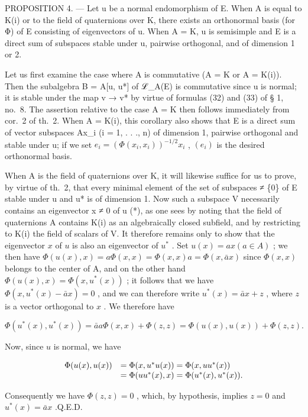 PROPOSITION 4. --- Let u be a normal endomorphism of E. When A is equal to K(i) or to the field of quaternions over K, there exists an orthonormal basis (for Φ) of E consisting of eigenvectors of u. When A = K, u is semisimple and E is a direct sum of subspaces stable under u, pairwise orthogonal, and of dimension 1 or 2.

Let us first examine the case where A is commutative (A = K or A = K(i)). Then the subalgebra B = A{[}u, u*{]} of ℒ\_A(E) is commutative since u is normal; it is stable under the map v → v* by virtue of formulas (32) and (33) of § 1, no.~8. The assertion relative to the case A = K then follows immediately from cor.~2 of th.~2. When A = K(i), this corollary also shows that E is a direct sum of vector subspaces Ax\_i (i = 1, . . ., n) of dimension 1, pairwise orthogonal and stable under u; if we set \(e_{i} = (\Phi(x_{i}, x_{i}))^{-1/2}x_{i}\) , \((e_{i})\) is the desired orthonormal basis.

When A is the field of quaternions over K, it will likewise suffice for us to prove, by virtue of th.~2, that every minimal element of the set of subspaces ≠ \{0\} of E stable under u and u* is of dimension 1. Now such a subspace V necessarily contains an eigenvector x ≠ 0 of u (*), as one sees by noting that the field of quaternions A contains K(i) as an algebraically closed subfield, and by restricting to K(i) the field of scalars of V. It therefore remains only to show that the eigenvector \(x\) of \(u\) is also an eigenvector of \(u^{*}\) . Set \(u(x) = ax (a \in A)\) ; we then have \(\Phi(u(x), x) = a\Phi(x, x) = \Phi(x, x)a = \Phi(x, \bar{a}x)\) since \(\Phi(x, x)\) belongs to the center of A, and on the other hand \(\Phi(u(x), x) = \Phi(x, u^*(x))\) ; it follows that we have \(\Phi(x, u^*(x) - \bar{a}x) = 0\) , and we can therefore write \(u^*(x) = \bar{a}x + z\) , where \(z\) is a vector orthogonal to \(x\) . We therefore have

\[
\Phi (u ^ {*} (x), u ^ {*} (x)) = \bar {a} a \Phi (x, x) + \Phi (z, z) = \Phi (u (x), u (x)) + \Phi (z, z).
\]

Now, since \(u\) is normal, we have

\[
\begin{array}{r l} \Phi (u (x), u (x)) & = \Phi (x, u ^ {*} u (x)) = \Phi (x, u u ^ {*} (x)) \\ & = \Phi (u u ^ {*} (x), x) = \Phi (u ^ {*} (x), u ^ {*} (x)). \end{array}
\]

Consequently we have \(\Phi(z, z) = 0\) , which, by hypothesis, implies \(z = 0\) and \(u^{*}(x) = \bar{a}x\) .Q.E.D.

